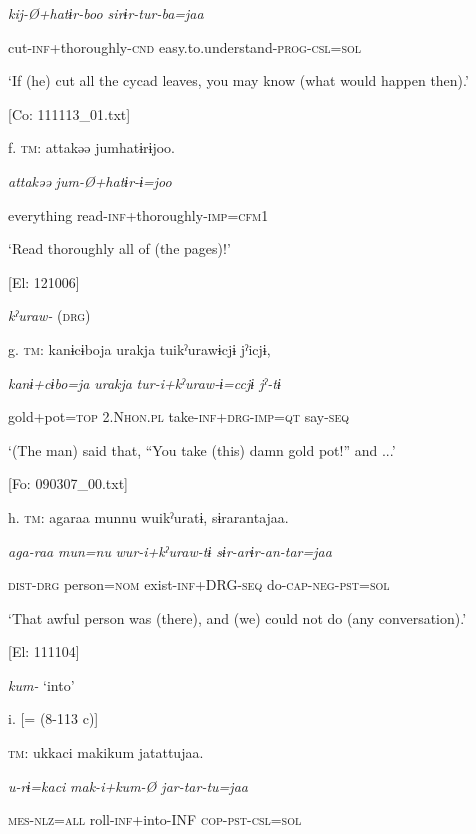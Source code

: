       \textit{kij-Ø+hatɨr{}-boo  sirɨr-tur-ba=jaa}

      cut-\textsc{inf}+thoroughly-\textsc{cnd}  easy.to.understand-\textsc{prog}-\textsc{csl}=\textsc{sol}

      ‘If (he) cut all the cycad leaves, you may know (what would happen then).’

      [Co: 111113\_01.txt]

  f.  \textsc{tm}:  attakəə  jumhatɨrɨjoo.

      \textit{attakəə}  \textit{jum-Ø+hatɨr{}-ɨ=joo}

      everything  read-\textsc{inf}+thoroughly-\textsc{imp}=\textsc{cfm}1

      ‘Read thoroughly all of (the pages)!’

      [El: 121006]

  \textit{kˀuraw-} (\textsc{drg})

  g.  \textsc{tm}:  kanɨcɨboja  urakja  tuikˀurawɨcjɨ  jˀicjɨ,

      \textit{kanɨ+cɨbo=ja}  \textit{urakja}  \textit{tur-i+kˀuraw{}-ɨ=ccjɨ  jˀ-tɨ}

      gold+pot=\textsc{top}  2.N\textsc{hon}.\textsc{pl}  take-\textsc{inf}+\textsc{drg}-\textsc{imp}=\textsc{qt}  say-\textsc{seq}

      ‘(The man) said that, “You take (this) damn gold pot!” and ...’

      [Fo: 090307\_00.txt]

  h.  \textsc{tm}:  agaraa  munnu  wuikˀuratɨ,  sɨrarantajaa.

      \textit{aga-raa}  \textit{mun=nu}  \textit{wur-i+kˀuraw{}-tɨ  sɨr-arɨr-an-tar=jaa}

      \textsc{dist}-\textsc{drg}  person=\textsc{nom}  exist-\textsc{inf}+DRG-\textsc{seq}  do-\textsc{cap}-\textsc{neg}-\textsc{pst}=\textsc{sol}

      ‘That awful person was (there), and (we) could not do (any conversation).’

      [El: 111104]

  \textit{kum-} ‘into’

  i.  [= (8-113 c)]

    \textsc{tm}:  ukkaci  makikum  jatattujaa.

      \textit{u-rɨ=kaci}  \textit{mak-i+kum{}-Ø  jar-tar-tu=jaa}

      \textsc{mes}-\textsc{nlz}=\textsc{all}  roll-\textsc{inf}+into-INF  \textsc{cop}-\textsc{pst}-\textsc{csl}=\textsc{sol}

